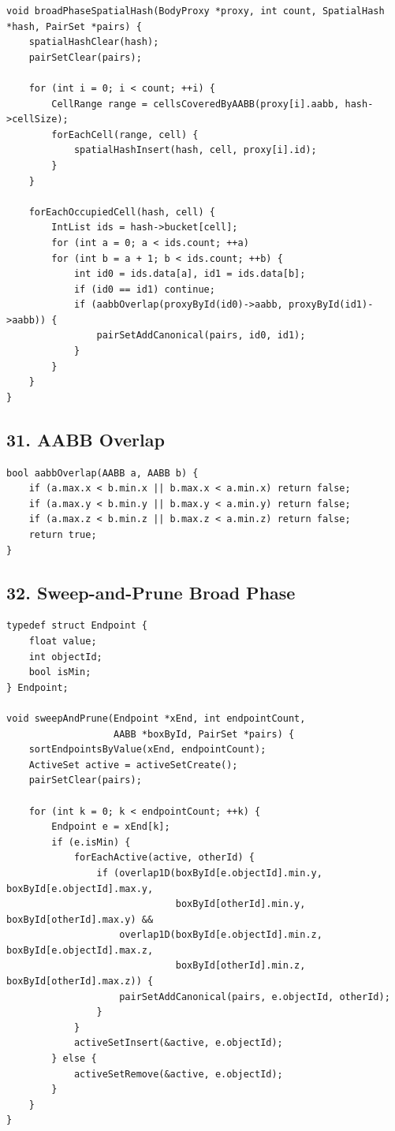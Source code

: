 \documentclass[10pt,letterpaper]{article}
\begin{document}
\begin{verbatim}
void broadPhaseSpatialHash(BodyProxy *proxy, int count, SpatialHash *hash, PairSet *pairs) {
    spatialHashClear(hash);
    pairSetClear(pairs);

    for (int i = 0; i < count; ++i) {
        CellRange range = cellsCoveredByAABB(proxy[i].aabb, hash->cellSize);
        forEachCell(range, cell) {
            spatialHashInsert(hash, cell, proxy[i].id);
        }
    }

    forEachOccupiedCell(hash, cell) {
        IntList ids = hash->bucket[cell];
        for (int a = 0; a < ids.count; ++a)
        for (int b = a + 1; b < ids.count; ++b) {
            int id0 = ids.data[a], id1 = ids.data[b];
            if (id0 == id1) continue;
            if (aabbOverlap(proxyById(id0)->aabb, proxyById(id1)->aabb)) {
                pairSetAddCanonical(pairs, id0, id1);
            }
        }
    }
}
\end{verbatim}

\subsection*{31. AABB Overlap}

\begin{verbatim}
bool aabbOverlap(AABB a, AABB b) {
    if (a.max.x < b.min.x || b.max.x < a.min.x) return false;
    if (a.max.y < b.min.y || b.max.y < a.min.y) return false;
    if (a.max.z < b.min.z || b.max.z < a.min.z) return false;
    return true;
}
\end{verbatim}

\subsection*{32. Sweep-and-Prune Broad Phase}

\begin{verbatim}
typedef struct Endpoint {
    float value;
    int objectId;
    bool isMin;
} Endpoint;

void sweepAndPrune(Endpoint *xEnd, int endpointCount,
                   AABB *boxById, PairSet *pairs) {
    sortEndpointsByValue(xEnd, endpointCount);
    ActiveSet active = activeSetCreate();
    pairSetClear(pairs);

    for (int k = 0; k < endpointCount; ++k) {
        Endpoint e = xEnd[k];
        if (e.isMin) {
            forEachActive(active, otherId) {
                if (overlap1D(boxById[e.objectId].min.y, boxById[e.objectId].max.y,
                              boxById[otherId].min.y, boxById[otherId].max.y) &&
                    overlap1D(boxById[e.objectId].min.z, boxById[e.objectId].max.z,
                              boxById[otherId].min.z, boxById[otherId].max.z)) {
                    pairSetAddCanonical(pairs, e.objectId, otherId);
                }
            }
            activeSetInsert(&active, e.objectId);
        } else {
            activeSetRemove(&active, e.objectId);
        }
    }
}
\end{verbatim}
\end{document}
